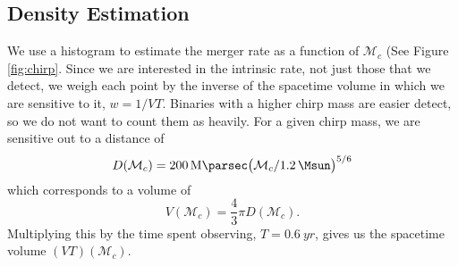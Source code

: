 \subsection{Density Estimation}

We use a histogram to estimate the merger rate as a function of $\mathcal{M}_c$ (See Figure \ref{fig:chirp}. Since we are interested in the intrinsic rate, not just those that we detect, we weigh each point by the inverse of the spacetime volume in which we are sensitive to it, $w = 1 / VT$. Binaries with a higher chirp mass are easier detect, so we do not want to count them as heavily. For a given chirp mass, we are sensitive out to a distance of
%
\begin{equation}
  D(\mathcal{M}_c) =
  \SI{200}{\mega\parsec} \qty( \mathcal{M}_c / \SI{1.2}{\Msun} )^{5/6}
\end{equation}
%
which corresponds to a volume of
%
\begin{equation}
  V(\mathcal{M}_c) = \frac{4}{3} \pi D(\mathcal{M}_c).
\end{equation}
%
Multiplying this by the time spent observing, $T = \SI{0.6}{yr}$, gives us the spacetime volume $(VT)(\mathcal{M}_c)$.